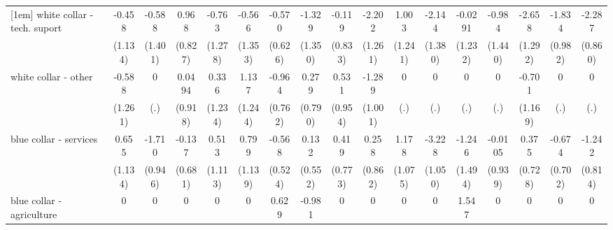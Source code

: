 {\begin{tabular}{l*{16}{c}}
[1em]
white collar - tech. suport&      -0.458         &      -0.588         &       0.968         &      -0.763         &      -0.566         &      -0.570         &      -1.329         &      -0.119         &      -2.202         &       1.003         &      -2.144         &     -0.0291         &      -0.984         &      -2.658\sym{*}  &      -1.834         &      -2.287\sym{**} \\
                    &     (1.134)         &     (1.401)         &     (0.827)         &     (1.278)         &     (1.353)         &     (0.626)         &     (1.350)         &     (0.833)         &     (1.261)         &     (1.241)         &     (1.380)         &     (1.232)         &     (1.440)         &     (1.292)         &     (0.982)         &     (0.860)         \\
[1em]
white collar - other&      -0.588         &           0         &      0.0494         &       0.336         &       1.137         &      -0.964         &       0.279         &       0.531         &      -1.289         &           0         &           0         &           0         &           0         &      -0.701         &           0         &           0         \\
                    &     (1.261)         &         (.)         &     (0.918)         &     (1.234)         &     (1.244)         &     (0.762)         &     (0.790)         &     (0.954)         &     (1.001)         &         (.)         &         (.)         &         (.)         &         (.)         &     (1.169)         &         (.)         &         (.)         \\
[1em]
blue collar - services&       0.655         &      -1.710         &      -0.137         &       0.513         &       0.799         &      -0.568         &       0.132         &       0.419         &       0.258         &       1.178         &      -3.228\sym{**} &      -1.246         &     -0.0105         &       0.375         &      -0.674         &      -1.242         \\
                    &     (1.134)         &     (0.946)         &     (0.681)         &     (1.113)         &     (1.139)         &     (0.524)         &     (0.552)         &     (0.773)         &     (0.862)         &     (1.075)         &     (1.050)         &     (1.494)         &     (0.939)         &     (0.728)         &     (0.702)         &     (0.814)         \\
[1em]
blue collar - agriculture&           0         &           0         &           0         &           0         &           0         &       0.629         &      -0.981         &           0         &           0         &           0         &           0         &       1.547         &           0         &           0         &           0         &           0         \\

\end{tabular}}
